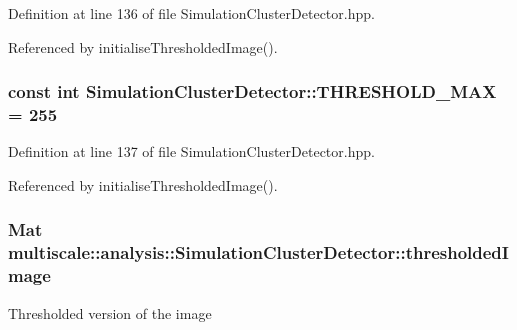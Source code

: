\-Definition at line 136 of file \-Simulation\-Cluster\-Detector.\-hpp.



\-Referenced by initialise\-Thresholded\-Image().

\hypertarget{classmultiscale_1_1analysis_1_1SimulationClusterDetector_a32b52c0ce7f8a1c8da872aa1cf754317}{
\subsubsection[{\-T\-H\-R\-E\-S\-H\-O\-L\-D\-\_\-\-M\-A\-X}]{\setlength{\rightskip}{0pt plus 5cm}const int {\bf \-Simulation\-Cluster\-Detector\-::\-T\-H\-R\-E\-S\-H\-O\-L\-D\-\_\-\-M\-A\-X} = 255}}\label{classmultiscale_1_1analysis_1_1SimulationClusterDetector_a32b52c0ce7f8a1c8da872aa1cf754317}


\-Definition at line 137 of file \-Simulation\-Cluster\-Detector.\-hpp.



\-Referenced by initialise\-Thresholded\-Image().

\hypertarget{classmultiscale_1_1analysis_1_1SimulationClusterDetector_aca2aae9914ef643a543a834e61b1cccf}{
\subsubsection[{thresholded\-Image}]{\setlength{\rightskip}{0pt plus 5cm}\-Mat {\bf multiscale\-::analysis\-::\-Simulation\-Cluster\-Detector\-::thresholded\-Image}}}\label{classmultiscale_1_1analysis_1_1SimulationClusterDetector_aca2aae9914ef643a543a834e61b1cccf}
\-Thresholded version of the image 

